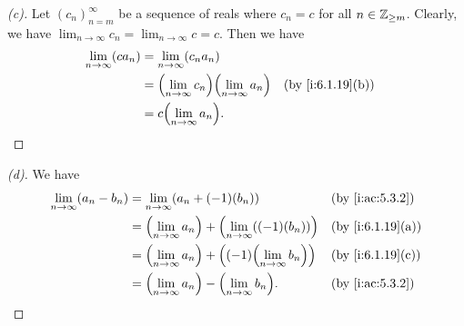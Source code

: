 \begin{proof}[(c)]
  Let \((c_n)_{n = m}^\infty\) be a sequence of reals where \(c_n = c\) for all \(n \in \mathbb{Z}_{\geq m}\).
  Clearly, we have \(\lim_{n \to \infty} c_n = \lim_{n \to \infty} c = c\).
  Then we have
  \begin{align*}
    \lim_{n \to \infty} (c a_n) & = \lim_{n \to \infty} (c_n a_n)                                                   \\
                                & = \pa{\lim_{n \to \infty} c_n} \pa{\lim_{n \to \infty} a_n} &  & \by{i:6.1.19}[b] \\
                                & = c \pa{\lim_{n \to \infty} a_n}.
  \end{align*}
\end{proof}

\begin{proof}[(d)]
  We have
  \begin{align*}
    \lim_{n \to \infty} (a_n - b_n) & = \lim_{n \to \infty} (a_n + (-1)(b_n))                                &  & \by{i:ac:5.3.2}  \\
                                    & = \pa{\lim_{n \to \infty} a_n} + \pa{\lim_{n \to \infty} ((-1)(b_n))}  &  & \by{i:6.1.19}[a] \\
                                    & = \pa{\lim_{n \to \infty} a_n} + \pa{(-1)\pa{\lim_{n \to \infty} b_n}} &  & \by{i:6.1.19}[c] \\
                                    & = \pa{\lim_{n \to \infty} a_n} - \pa{\lim_{n \to \infty} b_n}.         &  & \by{i:ac:5.3.2}
  \end{align*}
\end{proof}

